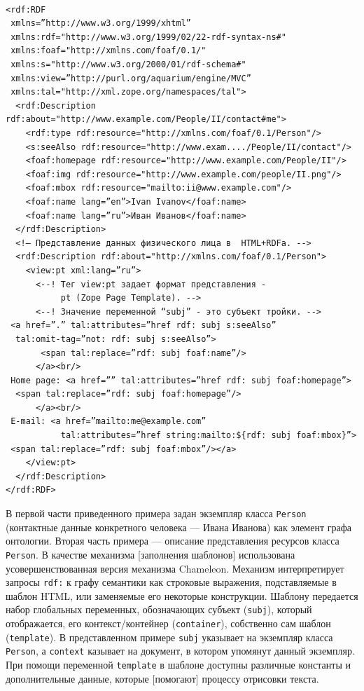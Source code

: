 \documentclass[utf8]{../IncArticle}
\newcommand{\e}[2][fcolor]{\textcolor{pcolor}{[}\textcolor{#1}{#2}\textcolor{pcolor}{]}}
\begin{document}
\begingroup%
\tt%
\begin{verbatim}
<rdf:RDF
 xmlns=”http://www.w3.org/1999/xhtml”
 xmlns:rdf="http://www.w3.org/1999/02/22-rdf-syntax-ns#"
 xmlns:foaf="http://xmlns.com/foaf/0.1/"
 xmlns:s="http://www.w3.org/2000/01/rdf-schema#"
 xmlns:view=”http://purl.org/aquarium/engine/MVC”
 xmlns:tal="http://xml.zope.org/namespaces/tal">
  <rdf:Description rdf:about="http://www.example.com/People/II/contact#me">
    <rdf:type rdf:resource="http://xmlns.com/foaf/0.1/Person"/>
    <s:seeAlso rdf:resource="http://www.exam..../People/II/contact"/>
    <foaf:homepage rdf:resource="http://www.example.com/People/II"/>
    <foaf:img rdf:resource="http://www.example.com/people/II.png"/>
    <foaf:mbox rdf:resource="mailto:ii@www.example.com"/>
    <foaf:name lang=”en”>Ivan Ivanov</foaf:name>
    <foaf:name lang=”ru”>Иван Иванов</foaf:name>
  </rdf:Description>
  <!— Представление данных физического лица в  HTML+RDFa. -->
  <rdf:Description rdf:about="http://xmlns.com/foaf/0.1/Person">
    <view:pt xml:lang=”ru”>
      <--! Тег view:pt задает формат представления -
           pt (Zope Page Template). -->
      <--! Значение переменной “subj” - это субъект тройки. -->
 <a href=”.” tal:attributes=”href rdf: subj s:seeAlso”
  tal:omit-tag=”not: rdf: subj s:seeAlso”>
       <span tal:replace=”rdf: subj foaf:name”/>
      </a><br/>
 Home page: <a href=”” tal:attributes=”href rdf: subj foaf:homepage”>
  <span tal:replace=”rdf: subj foaf:homepage”/>
      </a><br/>
 E-mail: <a href=”mailto:me@example.com”
           tal:attributes=”href string:mailto:${rdf: subj foaf:mbox}”>
 <span tal:replace=”rdf: subj foaf:mbox”/></a>
    </view:pt>
  </rdf:Description>
</rdf:RDF>
\end{verbatim}%
\endgroup

В первой части приведенного примера задан экземпляр класса
\texttt{Person} (контактные данные конкретного человека --- Ивана
Иванова) как элемент графа онтологии.  Вторая часть примера ---
описание представления ресурсов класса \texttt{Person}.  В качестве
механизма \e{заполнения шаблонов} использована усовершенствованная
версия механизма Chameleon.  Механизм интерпретирует запросы
\texttt{rdf:} к графу семантики как строковые выражения, подставляемые
в шаблон HTML, или заменяемые его некоторые конструкции.  Шаблону
передается набор глобальных переменных, обозначающих субъект
(\texttt{subj}), который отображается, его контекст/контейнер
(\texttt{container}), собственно сам шаблон (\texttt{template}).  В
представленном примере \texttt{subj} указывает на экземпляр класса
\texttt{Person}, а \texttt{context} казывает на документ, в котором
упомянут данный экземпляр.  При помощи переменной \texttt{template} в
шаблоне доступны различные константы и дополнительные данные, которые
\e{помогают} процессу отрисовки текста.
\end{document}
